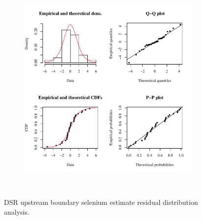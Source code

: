 \begin{linenumbers}
\begin{landscape}
\begin{figure}
\begin{subfigure}{0.7\textwidth}
			\includegraphics[width=\tableCustomSize]{"Figures/Results_DSR/Stochastic/Conc Model res-fit WIL"}
		\end{subfigure}\\
		\caption{DSR upstream boundary selenium estimate residual distribution analysis.}
	\end{figure}
\end{landscape}


\end{linenumbers}
